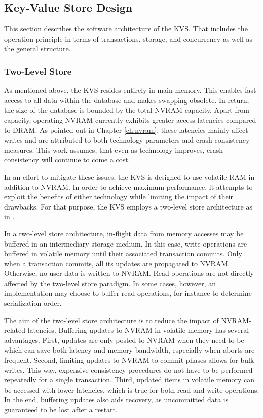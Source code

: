 \subsection{Key-Value Store Design}

This section describes the software architecture of the KVS. That includes the
operation principle in terms of transactions, storage, and concurrency as well
as the general structure.

\subsubsection{Two-Level Store}

As mentioned above, the KVS resides entirely in main memory. This enables fast
access to all data within the database and makes swapping obsolete. In return,
the size of the database is bounded by the total NVRAM capacity. Apart from
capacity, operating NVRAM currently exhibits greater access latencies compared
to DRAM. As pointed out in Chapter \ref{ch:nvram}, these latencies mainly affect
writes and are attributed to both technology parameters and crash consistency
measures. This work assumes, that even as technology improves, crash consistency
will continue to come a cost.

In an effort to mitigate these issues, the KVS is designed to use volatile RAM
in addition to NVRAM. In order to achieve maximum performance, it attempts to
exploit the benefits of either technology while limiting the impact of their
drawbacks. For that purpose, the KVS employs a two-level store architecture as
in \cite{bailey2013exploring}.

In a two-level store architecture, in-flight data from memory accesses may be
buffered in an intermediary storage medium. In this case, write operations are
buffered in volatile memory until their associated transaction commits. Only
when a transaction commits, all its updates are propagated to NVRAM. Otherwise,
no user data is written to NVRAM. Read operations are not directly affected by
the two-level store paradigm. In some cases, however, an implementation may
choose to buffer read operations, for instance to determine serialization order.

The aim of the two-level store architecture is to reduce the impact of
NVRAM-related latencies. Buffering updates to NVRAM in volatile memory has
several advantages. First, updates are only posted to NVRAM when they need to
be which can save both latency and memory bandwidth, especially when aborts are
frequent. Second, limiting updates to NVRAM to commit phases allows for bulk
writes. This way, expensive consistency procedures do not have to be performed
repeatedly for a single transaction. Third, updated items in volatile memory can
be accessed with lower latencies, which is true for both read and write
operations. In the end, buffering updates also aids recovery, as uncommitted
data is guaranteed to be lost after a restart.

